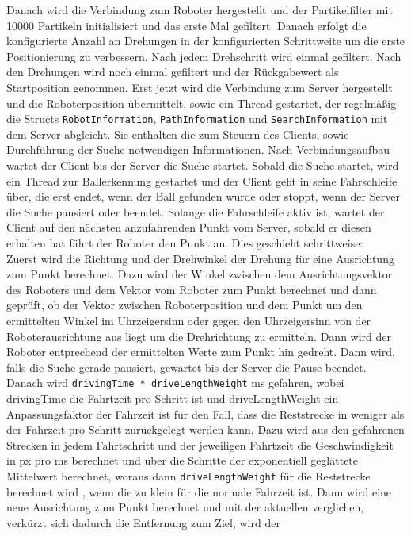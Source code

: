 Danach wird die Verbindung zum Roboter hergestellt und der Partikelfilter
mit 10000 Partikeln initialisiert und das erste Mal gefiltert. Danach
erfolgt die konfigurierte Anzahl an Drehungen in der konfigurierten
Schrittweite um die erste Positionierung zu verbessern. Nach jedem
Drehschritt wird einmal gefiltert. Nach den Drehungen wird noch einmal
gefiltert und der Rückgabewert als Startposition genommen. Erst jetzt wird
die Verbindung zum Server hergestellt und die Roboterposition übermittelt,
sowie ein Thread gestartet, der regelmäßig die Structs \lstinline|RobotInformation|,
\lstinline|PathInformation| und \lstinline|SearchInformation| mit dem
Server abgleicht.  Sie enthalten die zum Steuern des Clients, sowie
Durchführung der Suche notwendigen Informationen.  Nach
Verbindungsaufbau wartet der Client bis der Server die Suche startet. 
Sobald die Suche startet, wird ein  Thread zur
Ballerkennung gestartet und der Client geht in seine Fahrschleife über, die
 erst endet, wenn der Ball gefunden wurde oder stoppt, wenn der Server
 die Suche pausiert oder beendet. Solange die Fahrschleife aktiv ist,
 wartet der Client auf den nächsten anzufahrenden Punkt vom Server,
sobald er diesen erhalten hat fährt der Roboter den Punkt an.
Dies geschieht schrittweise:\\
Zuerst wird die Richtung und der Drehwinkel der Drehung für eine
Ausrichtung zum Punkt berechnet. Dazu wird der Winkel zwischen dem
Ausrichtungsvektor des Roboters und dem Vektor vom Roboter zum Punkt berechnet und dann geprüft,
ob der Vektor zwischen Roboterposition und dem Punkt um den ermittelten
Winkel im Uhrzeigersinn oder gegen den Uhrzeigersinn von der
Roboterausrichtung aus liegt um die Drehrichtung zu ermitteln. Dann wird
der Roboter entprechend der ermittelten Werte zum Punkt hin gedreht.
Dann wird, falls die Suche gerade pausiert, gewartet bis der Server die
Pause beendet. Danach wird 
\lstinline|drivingTime * driveLengthWeight| ms gefahren, wobei drivingTime die
Fahrtzeit pro Schritt ist und driveLengthWeight ein Anpassungsfaktor der
Fahrzeit ist für den Fall, dass die Reststrecke in weniger als der
Fahrzeit pro Schritt zurückgelegt werden kann. Dazu wird aus den gefahrenen Strecken in jedem
Fahrtschritt und der jeweiligen Fahrtzeit die Geschwindigkeit in px pro ms
berechnet und über die Schritte der exponentiell geglättete Mittelwert
berechnet, woraus dann \lstinline|driveLengthWeight| für die Reststrecke berechnet wird
, wenn die zu klein für die normale Fahrzeit ist. 
Dann wird eine neue Ausrichtung zum Punkt berechnet und mit der aktuellen
 verglichen, verkürzt sich dadurch die Entfernung zum Ziel, wird der
